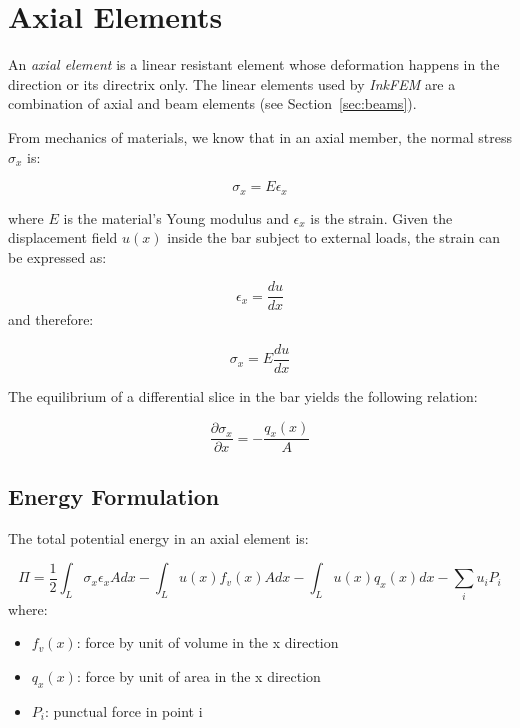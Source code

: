 \section{Axial Elements}
\label{sec:axial}

An \emph{axial element} is a linear resistant element whose deformation happens in the direction or its directrix only.
The linear elements used by \emph{InkFEM} are a combination of axial and beam elements (see Section~\ref{sec:beams}).

From mechanics of materials, we know that in an axial member, the normal stress $\sigma_x$ is:

\begin{equation}
  \sigma_x = E \epsilon_x
\end{equation}

where $E$ is the material's Young modulus and $\epsilon_x$ is the strain.
Given the displacement field $u(x)$ inside the bar subject to external loads, the strain can be expressed as:

\begin{equation}
  \epsilon_x = \frac{du}{dx}  
\end{equation}
and therefore:

\[
  \sigma_x = E \frac{du}{dx}
\]

The equilibrium of a differential slice in the bar yields the following relation:

\begin{equation}
  \frac{\partial \sigma_x}{\partial x} = - \frac{q_x(x)}{A}  
\end{equation}


\subsection{Energy Formulation}

The total potential energy in an axial element is:

\begin{equation}
  \Pi = \frac{1}{2} \int_L \sigma_x \epsilon_x A dx 
  - \int_L u(x) f_v(x) A dx 
  - \int_L u(x) q_x(x) dx 
  - \sum_i u_i P_i
\end{equation}
where:

\begin{itemize}
  \item $f_v(x)$: force by unit of volume in the x direction
  \item $q_x(x)$: force by unit of area in the x direction
  \item $P_i$: punctual force in point i
\end{itemize}

